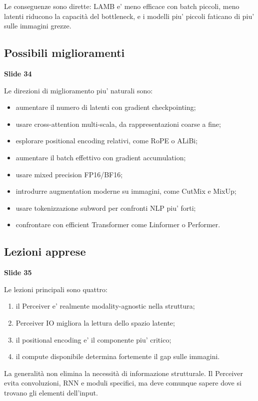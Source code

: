 \documentclass[11pt,a4paper]{article}
\newcommand{\slide}[1]{\textcolor{mainblue}{\textbf{Slide #1}}}
\begin{document}
Le conseguenze sono dirette: LAMB e' meno efficace con batch piccoli, meno
latenti riducono la capacit\`a del bottleneck, e i modelli piu' piccoli faticano
di piu' sulle immagini grezze.

\subsection{Possibili miglioramenti}
\slide{34}

Le direzioni di miglioramento piu' naturali sono:
\begin{itemize}
  \item aumentare il numero di latenti con gradient checkpointing;
  \item usare cross-attention multi-scala, da rappresentazioni coarse a fine;
  \item esplorare positional encoding relativi, come RoPE o ALiBi;
  \item aumentare il batch effettivo con gradient accumulation;
  \item usare mixed precision FP16/BF16;
  \item introdurre augmentation moderne su immagini, come CutMix e MixUp;
  \item usare tokenizzazione subword per confronti NLP piu' forti;
  \item confrontare con efficient Transformer come Linformer o Performer.
\end{itemize}

\subsection{Lezioni apprese}
\slide{35}

Le lezioni principali sono quattro:
\begin{enumerate}
  \item il Perceiver e' realmente modality-agnostic nella struttura;
  \item Perceiver IO migliora la lettura dello spazio latente;
  \item il positional encoding e' il componente piu' critico;
  \item il compute disponibile determina fortemente il gap sulle immagini.
\end{enumerate}

\begin{takeawaybox}[title={Takeaway principale}]
La generalit\`a non elimina la necessit\`a di informazione strutturale. Il
Perceiver evita convoluzioni, RNN e moduli specifici, ma deve comunque sapere
dove si trovano gli elementi dell'input.
\end{takeawaybox}
\end{document}
